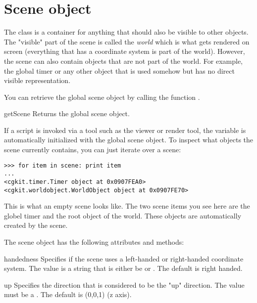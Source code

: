 
\section{Scene object}

The  class is a container for anything that should also
be visible to other objects. The "visible" part of the scene is called
the {\em world} which is what gets rendered on screen (everything that
has a coordinate system is part of the world). However, the scene can
also contain objects that are not part of the world. For example, the
global timer or any other object that is used somehow but has no
direct visible representation.

You can retrieve the global scene object by calling the function 
. 

\begin{funcdesc}{getScene}{}
Returns the global scene object.
\end{funcdesc}

If a script is invoked via a tool such as the viewer or render tool,
the variable  is automatically initialized with the global
scene object. To inspect what objects the scene currently contains,
you can just iterate over a scene:

\begin{verbatim}
>>> for item in scene: print item
...
<cgkit.timer.Timer object at 0x0907FEA0>
<cgkit.worldobject.WorldObject object at 0x0907FE70>
\end{verbatim}

This is what an empty scene looks like. The two scene items you see here
are the globel timer and the root object of the world. These objects are
automatically created by the scene.


The scene object has the following attributes and methods:

\begin{memberdesc}{handedness}
Specifies if the scene uses a left-handed or right-handed coordinate
system. The value is a string that is either be  or .
The default is right handed.
\end{memberdesc}

\begin{memberdesc}{up}
Specifies the direction that is considered to be the "up" direction. The 
value must be a . The default is (0,0,1) (z axis).
\end{memberdesc}

